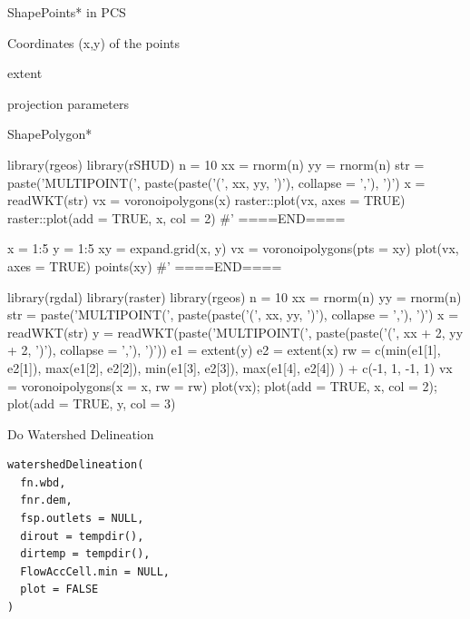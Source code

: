 \documentclass[a4paper]{book}
\begin{document}
%
\begin{Arguments}
\begin{ldescription}
\item[\code{x}] ShapePoints* in PCS

\item[\code{pts}] Coordinates (x,y) of the points

\item[\code{rw}] extent

\item[\code{crs}] projection parameters
\end{ldescription}
\end{Arguments}
%
\begin{Value}
ShapePolygon*
\end{Value}
%
\begin{Examples}
\begin{ExampleCode}
library(rgeos)
library(rSHUD)
n = 10
xx = rnorm(n)
yy = rnorm(n)
str = paste('MULTIPOINT(', paste(paste('(', xx, yy, ')'), collapse = ','), ')')
x = readWKT(str)
vx = voronoipolygons(x)
raster::plot(vx, axes = TRUE)
raster::plot(add = TRUE, x, col = 2)
#' ====END====

x = 1:5
y = 1:5
xy = expand.grid(x, y)
vx = voronoipolygons(pts = xy)
plot(vx, axes = TRUE)
points(xy)
#' ====END====

library(rgdal)
library(raster)
library(rgeos)
n = 10
xx = rnorm(n)
yy = rnorm(n)
str = paste('MULTIPOINT(', paste(paste('(', xx, yy, ')'), collapse = ','), ')')
x = readWKT(str)
y = readWKT(paste('MULTIPOINT(', paste(paste('(', xx + 2, yy + 2, ')'), collapse = ','), ')'))
e1 = extent(y)
e2 = extent(x)
rw = c(min(e1[1], e2[1]),
       max(e1[2], e2[2]),
       min(e1[3], e2[3]),
       max(e1[4], e2[4]) ) + c(-1, 1, -1, 1)
vx = voronoipolygons(x = x, rw = rw)
plot(vx); plot(add = TRUE, x, col = 2); plot(add = TRUE, y, col = 3)
\end{ExampleCode}
\end{Examples}
%
\begin{Description}\relax
Do Watershed Delineation
\end{Description}
%
\begin{Usage}
\begin{verbatim}
watershedDelineation(
  fn.wbd,
  fnr.dem,
  fsp.outlets = NULL,
  dirout = tempdir(),
  dirtemp = tempdir(),
  FlowAccCell.min = NULL,
  plot = FALSE
)
\end{verbatim}
\end{Usage}
\end{document}
